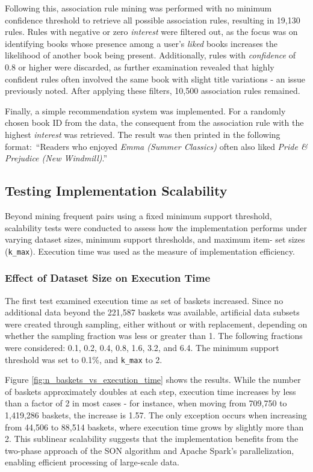 \documentclass{Class/julia}
\begin{document}
Following this, association rule mining was performed with no minimum confidence threshold to retrieve all possible association rules, resulting in 19,130 rules. Rules with negative or zero \textit{interest} were filtered out, as the focus was on identifying books whose presence among a user's \textit{liked} books increases the likelihood of another book being present. Additionally, rules with \textit{confidence} of 0.8 or higher were discarded, as further examination revealed that highly confident rules often involved the same book with slight title variations - an issue previously noted. After applying these filters, 10,500 association rules remained.

Finally, a simple recommendation system was implemented. For a randomly chosen book ID from the data, the consequent from the association rule with the highest \textit{interest} was retrieved. The result was then printed in the following format:\ ``Readers who enjoyed \textit{Emma (Summer Classics)} often also liked \textit{Pride \& Prejudice (New Windmill)}.''

\subsection{Testing Implementation Scalability}

Beyond mining frequent pairs using a fixed minimum support threshold, scalability tests were conducted to assess how the implementation performs under varying dataset sizes, minimum support thresholds, and maximum item- set sizes (\texttt{k\_max}). Execution time was used as the measure of implementation efficiency.

\subsubsection{Effect of Dataset Size on Execution Time}

The first test examined execution time as set of baskets increased. Since no additional data beyond the 221,587 baskets was available, artificial data subsets were created through sampling, either without or with replacement, depending on whether the sampling fraction was less or greater than 1. The following fractions were considered: 0.1, 0.2, 0.4, 0.8, 1.6, 3.2, and 6.4. The minimum support threshold was set to 0.1\%, and \texttt{k\_max} to 2.

Figure \ref{fig:n_baskets_vs_execution_time} shows the results. While the number of baskets approximately doubles at each step, execution time increases by less than a factor of 2 in most cases - for instance, when moving from 709,750 to 1,419,286 baskets, the increase is 1.57. The only exception occurs when increasing from 44,506 to 88,514 baskets, where execution time grows by slightly more than 2. This sublinear scalability suggests that the implementation benefits from the two-phase approach of the SON algorithm and Apache Spark’s parallelization, enabling efficient processing of large-scale data.
\end{document}
